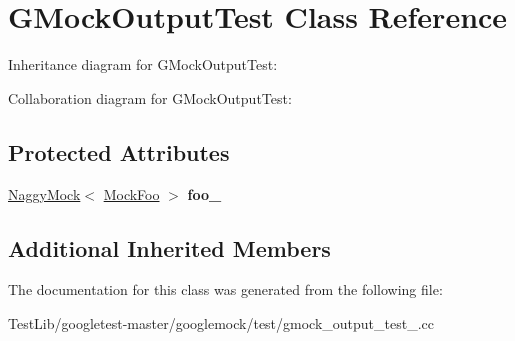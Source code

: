\hypertarget{classGMockOutputTest}{}\section{G\+Mock\+Output\+Test Class Reference}
\label{classGMockOutputTest}


Inheritance diagram for G\+Mock\+Output\+Test\+:


Collaboration diagram for G\+Mock\+Output\+Test\+:
\subsection*{Protected Attributes}
\begin{DoxyCompactItemize}
\item 
\mbox{\label{classGMockOutputTest_aed97d2ca515d69466968c60575cc18a2}} 
\hyperlink{classtesting_1_1NaggyMock}{Naggy\+Mock}$<$ \hyperlink{classMockFoo}{Mock\+Foo} $>$ {\bfseries foo\+\_\+}
\end{DoxyCompactItemize}
\subsection*{Additional Inherited Members}


The documentation for this class was generated from the following file\+:\begin{DoxyCompactItemize}
\item 
Test\+Lib/googletest-\/master/googlemock/test/gmock\+\_\+output\+\_\+test\+\_\+.\+cc\end{DoxyCompactItemize}
